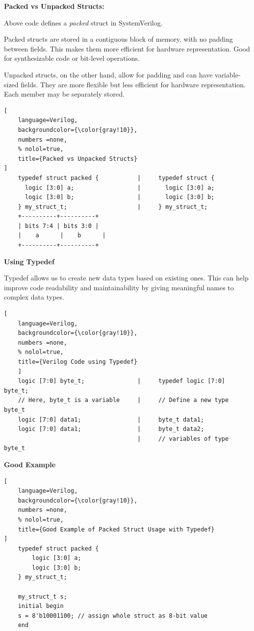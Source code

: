 \documentclass[12pt, a4paper]{article}
\begin{document}
\textbf{Packed vs Unpacked Structs:}

Above code defines a \textit{packed} struct in SystemVerilog. 

Packed structs are stored in a contiguous block of memory, with no padding between fields. This makes them more efficient for hardware representation. Good for synthesizable code or bit-level operations.

\vspace{1em}

Unpacked structs, on the other hand, allow for padding and can have variable-sized fields. They are more flexible but less efficient for hardware representation. Each member may be separately stored.

\begin{lstlisting}[
    language=Verilog,
    backgroundcolor={\color{gray!10}},
    numbers =none,
    % nolol=true,
    title={Packed vs Unpacked Structs}
]
    typedef struct packed {           |     typedef struct {
      logic [3:0] a;                  |       logic [3:0] a;
      logic [3:0] b;                  |       logic [3:0] b;
    } my_struct_t;                    |     } my_struct_t;
    +----------+----------+
    | bits 7:4 | bits 3:0 |
    |    a      |    b      |
    +----------+----------+
\end{lstlisting}

\vspace{1em}

\textbf{Using Typedef}

Typedef allows us to create new data types based on existing ones. This can help improve code readability and maintainability by giving meaningful names to complex data types.


\begin{lstlisting}[
    language=Verilog,
    backgroundcolor={\color{gray!10}},
    numbers =none,
    % nolol=true,
    title={Verilog Code using Typedef}
    ]
    logic [7:0] byte_t;               |     typedef logic [7:0] byte_t;  
    // Here, byte_t is a variable     |     // Define a new type byte_t
    logic [7:0] data1;                |     byte_t data1;     
    logic [7:0] data1;                |     byte_t data2;   
                                      |     // variables of type byte_t
\end{lstlisting}


\textbf{Good Example}

\begin{lstlisting}[
    language=Verilog,
    backgroundcolor={\color{gray!10}},
    numbers =none,
    % nolol=true,
    title={Good Example of Packed Struct Usage with Typedef}
]
    typedef struct packed {
        logic [3:0] a;
        logic [3:0] b;
    } my_struct_t;

    my_struct_t s;
    initial begin
    s = 8'b10001100; // assign whole struct as 8-bit value
    end
\end{lstlisting}
\end{document}
